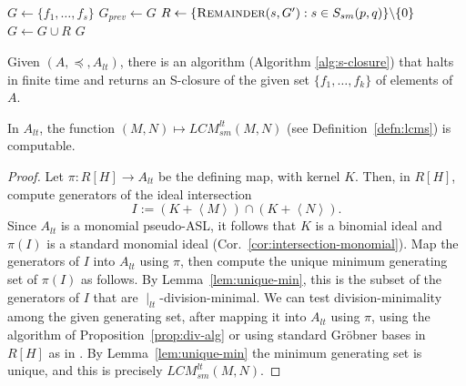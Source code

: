 \documentclass[11pt,reqno]{amsart}
\newcommand{\suchthat}{:}
\newcommand{\ideal}[1]{\left\langle#1\right\rangle}
\newcommand{\ltdivides}{\mid_{lt}}
\newcommand{\lcmlt}{LCM_{sm}^{lt}}
\newcommand{\Ssm}{S_{sm}}
\theoremstyle{definition}
\numberwithin{equation}{section}
\begin{document}
\begin{algorithm}[h]
\caption{Computes S-closure of a finite set with respect to $(A, \preceq, A_{lt})$}
\label{alg:s-closure}
\begin{algorithmic}[1]
\medskip
{}
    \State $G \leftarrow \{f_1, \ldots, f_s\}$
    \Repeat
    	\State $G_{prev} \leftarrow G$
         		\State $R \leftarrow \{\textsc{Remainder}(s, G') \suchthat s \in \Ssm(p, q)\} \backslash \{0\}$ 
		\State $G \leftarrow G \cup R$
         \EndFor
    \State \Return $G$
\EndProcedure
\end{algorithmic}
\end{algorithm}

\begin{theorem}[store=thmcomputablesclosure] 
\label{thm:computable-Sclosure}
Given $(A, \preceq, A_{lt})$, there is an algorithm (Algorithm \ref{alg:s-closure}) that halts in finite time and returns an S-closure of the given set $\{f_1, \dotsc, f_k\}$ of elements of $A$.
\end{theorem}

\begin{lemma} \label{lem:comp-LCM}
In $A_{lt}$, the function $(M,N) \mapsto \lcmlt(M,N)$ (see Definition~\ref{defn:lcms}) is computable.
\end{lemma}

\begin{proof}
Let $\pi \colon R[H] \to A_{lt}$ be the defining map, with kernel $K$. Then, in $R[H]$, compute generators of the ideal intersection 
\[
I := (K + \ideal{M}) \cap (K + \ideal{N}).
\]
Since $A_{lt}$ is a monomial pseudo-ASL, it follows that $K$ is a binomial ideal and $\pi(I)$ is a standard monomial ideal (Cor.~\ref{cor:intersection-monomial}). Map the generators of $I$ into $A_{lt}$ using $\pi$, then compute the unique minimum generating set of $\pi(I)$ as follows. By Lemma~\ref{lem:unique-min}, this is the subset of the generators of $I$ that are $\ltdivides$-division-minimal. We can test division-minimality among the given generating set, after mapping it into $A_{lt}$ using $\pi$, using the algorithm of Proposition~\ref{prop:div-alg} or using standard Gröbner bases in $R[H]$ as in \cite{ES}. By Lemma~\ref{lem:unique-min} the minimum generating set is unique, and this is precisely $\lcmlt(M,N)$.
\end{proof}
\end{document}
